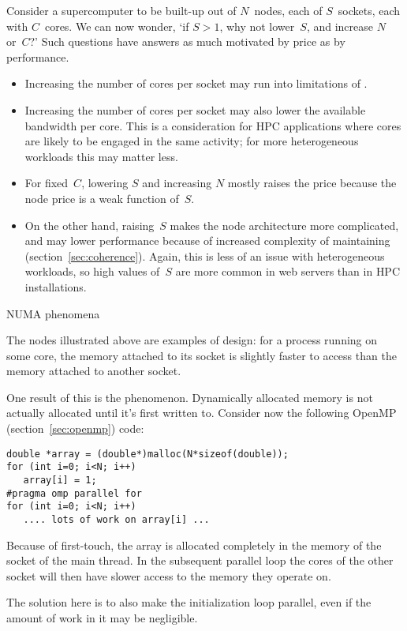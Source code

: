 Consider a supercomputer 
to be built-up out of $N$~nodes, each of $S$~sockets,
each with $C$~cores. 
We can now wonder, `if $S>1$, why not lower~$S$,
and increase $N$ or~$C$?'
Such questions have answers as much motivated by price as by performance.
\begin{itemize}
\item Increasing the number of cores per socket may run into
  limitations of .
\item Increasing the number of cores per socket may also
  lower the available bandwidth per core.
  This is a consideration for \ac{HPC} applications where
  cores are likely to be engaged in the same activity;
  for more heterogeneous workloads this may matter less.
\item For fixed~$C$, lowering $S$ and increasing $N$ mostly raises
  the price because the node price is a weak function of~$S$.
\item On the other hand, raising~$S$ makes the node architecture
  more complicated, and may lower performance because of
  increased complexity of maintaining 
  (section~\ref{sec:coherence}).
  Again, this is less of an issue with heterogeneous workloads,
  so high values of~$S$ are more common in web servers than
  in \ac{HPC} installations.
\end{itemize}

 {NUMA phenomena}

The nodes illustrated above are examples of  design:
for a process running on some core,
the memory attached to its socket is slightly faster to
access than the memory attached to another socket.

One result of this is the  phenomenon.
Dynamically allocated memory is not actually allocated until it's
first written to. Consider now the following OpenMP
(section~\ref{sec:openmp}) code:
\begin{lstlisting}
double *array = (double*)malloc(N*sizeof(double));
for (int i=0; i<N; i++)
   array[i] = 1;
#pragma omp parallel for
for (int i=0; i<N; i++)
   .... lots of work on array[i] ...
\end{lstlisting}
Because of first-touch, the array is allocated completely in the
memory of the socket of the main thread.
In the subsequent parallel
loop the cores of the other socket will then have slower access to the
memory they operate on.

The solution here is to also make the initialization loop parallel,
even if the amount of work in it may be negligible.

